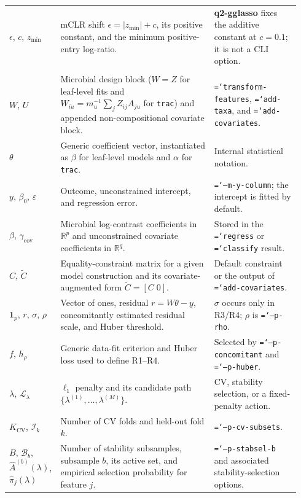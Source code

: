 \documentclass[11pt,a4paper]{article}
\newcommand{\code}[1]{\allowbreak\texttt{\hyphenchar\font=`\-\relax #1}}
\newcommand{\pkg}[1]{\textbf{#1}}
\newcommand{\R}{\mathbb{R}}
\newcommand{\bbeta}{\beta}
\newcommand{\one}{\mathbf{1}}
\begin{document}
\begin{longtable}{@{}p{0.16\linewidth}p{0.50\linewidth}p{0.28\linewidth}@{}}
$\epsilon$, $c$, $z_{\min}$ & mCLR shift $\epsilon=|z_{\min}|+c$, its positive constant, and the minimum positive-entry log-ratio. & \pkg{q2-gglasso} fixes the additive constant at $c=0.1$; it is not a CLI option. \\
\addlinespace
\multicolumn{3}{@{}l}{\textit{Sparse log-contrast regression and classification (\pkg{q2-classo})}} \\
$W$, $U$ & Microbial design block ($W=Z$ for leaf-level fits and $W_{iu}=m_u^{-1}\sum_j Z_{ij}A_{ju}$ for \texttt{trac}) and appended non-compositional covariate block. & \code{transform-features}, \code{add-taxa}, and \code{add-covariates}. \\
$\theta$ & Generic coefficient vector, instantiated as $\bbeta$ for leaf-level models and $\alpha$ for \texttt{trac}. & Internal statistical notation. \\
$y$, $\beta_0$, $\varepsilon$ & Outcome, unconstrained intercept, and regression error. & \code{--m-y-column}; the intercept is fitted by default. \\
$\bbeta$, $\gamma_{\mathrm{cov}}$ & Microbial log-contrast coefficients in $\R^p$ and unconstrained covariate coefficients in $\R^q$. & Stored in the \code{regress} or \code{classify} result. \\
$C$, $\widetilde C$ & Equality-constraint matrix for a given model construction and its covariate-augmented form $\widetilde C=[C\;0]$. & Default constraint or the output of \code{add-covariates}. \\
$\one_p$, $r$, $\sigma$, $\rho$ & Vector of ones, residual $r=W\theta-y$, concomitantly estimated residual scale, and Huber threshold. & $\sigma$ occurs only in R3/R4; $\rho$ is \code{--p-rho}. \\
$f$, $h_\rho$ & Generic data-fit criterion and Huber loss used to define R1--R4. & Selected by \code{--p-concomitant} and \code{--p-huber}. \\
$\lambda$, $\mathcal{L}_{\lambda}$ & $\ell_1$ penalty and its candidate path $\{\lambda^{(1)},\ldots,\lambda^{(M)}\}$. & CV, stability selection, or a fixed-penalty action. \\
$K_{\mathrm{CV}}$, $\mathcal I_k$ & Number of CV folds and held-out fold $k$. & \code{--p-cv-subsets}. \\
$B$, $\mathcal B_b$, $\widehat A^{(b)}(\lambda)$, $\widehat\pi_j(\lambda)$ & Number of stability subsamples, subsample $b$, its active set, and empirical selection probability for feature $j$. & \code{--p-stabsel-b} and associated stability-selection options. \\

\end{longtable}
\end{document}
